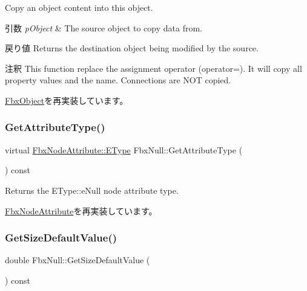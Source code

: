 Copy an object content into this object. 
\begin{DoxyParams}{引数}
{\em p\+Object} & The source object to copy data from. \\
\hline
\end{DoxyParams}
\begin{DoxyReturn}{戻り値}
Returns the destination object being modified by the source. 
\end{DoxyReturn}
\begin{DoxyRemark}{注釈}
This function replace the assignment operator (operator=). It will copy all property values and the name. Connections are N\+OT copied. 
\end{DoxyRemark}


\hyperlink{class_fbx_object_a0c0c5adb38284d14bb82c04d54504a3e}{Fbx\+Object}を再実装しています。

\mbox{\label{class_fbx_null_a16b32e758ed2fe821e2c895526b71925}} 
\subsubsection{\texorpdfstring{Get\+Attribute\+Type()}{GetAttributeType()}}
{\footnotesize\ttfamily virtual \hyperlink{class_fbx_node_attribute_a08e1669d3d1a696910756ab17de56d6a}{Fbx\+Node\+Attribute\+::\+E\+Type} Fbx\+Null\+::\+Get\+Attribute\+Type (\begin{DoxyParamCaption}{ }\end{DoxyParamCaption}) const\hspace{0.3cm}{\ttfamily [virtual]}}



Returns the E\+Type\+::e\+Null node attribute type. 



\hyperlink{class_fbx_node_attribute_a1c2116756906127145a2b8721fc26752}{Fbx\+Node\+Attribute}を再実装しています。

\mbox{\label{class_fbx_null_a2d6dbed70d91457c2d7c50007b8f148e}} 
\subsubsection{\texorpdfstring{Get\+Size\+Default\+Value()}{GetSizeDefaultValue()}}
{\footnotesize\ttfamily double Fbx\+Null\+::\+Get\+Size\+Default\+Value (\begin{DoxyParamCaption}{ }\end{DoxyParamCaption}) const}

